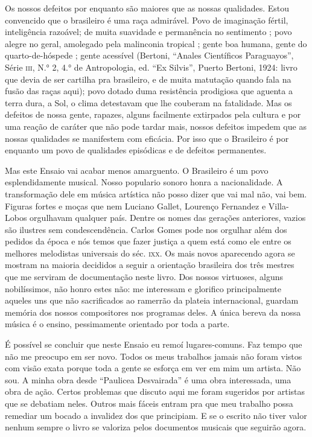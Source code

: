 Os nossos defeitos por enquanto são maiores que as nossas qualidades.
Estou convencido que o brasileiro é uma raça admirável. Povo de
imaginação fértil, inteligência razoável; de muita suavidade e
permanência no sentimento ; povo alegre no geral, amolegado pela
malinconia tropical ; gente boa humana, gente do quarto-de-hóspede ;
gente acessível (Bertoni, ``Anales Científicos Paraguayos'', Série \textsc{iii},
N.° 2, 4.° de Antropologia, ed. ``Ex Silvis'', Puerto Bertoni, 1924: livro
que devia de ser cartilha pra brasileiro, e de muita matutação quando
fala na fusão das raças aqui); povo dotado duma resistência prodigiosa
que aguenta a terra dura, a Sol, o clima detestavam que lhe couberam na
fatalidade. Mas os defeitos de nossa gente, rapazes, alguns facilmente
extirpados pela cultura e por uma reação de caráter que não pode tardar
mais, nossos defeitos impedem que as nossas qualidades se manifestem com
eficácia. Por isso que o Brasileiro é por enquanto um povo de qualidades
episódicas e de defeitos permanentes.

Mas este Ensaio vai acabar menos amarguento. O Brasileiro é um povo
esplendidamente musical. Nosso populario sonoro honra a nacionalidade. A
transformação dele em música artística não posso dizer que vai mal não,
vai bem. Figuras fortes e moças que nem Luciano Gallet, Lourenço
Fernandez e Villa-Lobos orgulhavam qualquer país. Dentre os nomes das
gerações anteriores, vazios são ilustres sem condescendência. Carlos
Gomes pode nos orgulhar além dos pedidos da época e nós temos que fazer
justiça a quem está como ele entre os melhores melodistas universais do
séc. \textsc{ixx}. Os mais novos aparecendo agora se mostram na maioria decididos
a seguir a orientação brasileira dos três mestres que me serviram de
documentação neste livro. Dos nossos virtuoses, alguns nobilíssimos, não
honro estes não: me interessam e glorifico principalmente aqueles uns
que não sacrificados ao ramerrão da plateia internacional, guardam
memória dos nossos compositores nos programas deles. A única bereva da
nossa música é o ensino, pessimamente orientado por toda a parte.

É possível se concluir que neste Ensaio eu remoí lugares-comuns. Faz
tempo que não me preocupo em ser novo. Todos os meus trabalhos jamais
não foram vistos com visão exata porque toda a gente se esforça em ver
em mim um artista. Não sou. A minha obra desde ``Paulicea Desvairada'' é
uma obra interessada, uma obra de ação. Certos problemas que discuto
aqui me foram sugeridos por artistas que se debatiam neles. Outros mais
fáceis entram pra que meu trabalho possa remediar um bocado a invalidez
dos que principiam. E se o escrito não tiver valor nenhum sempre o livro
se valoriza pelos documentos musicais que seguirão agora.


